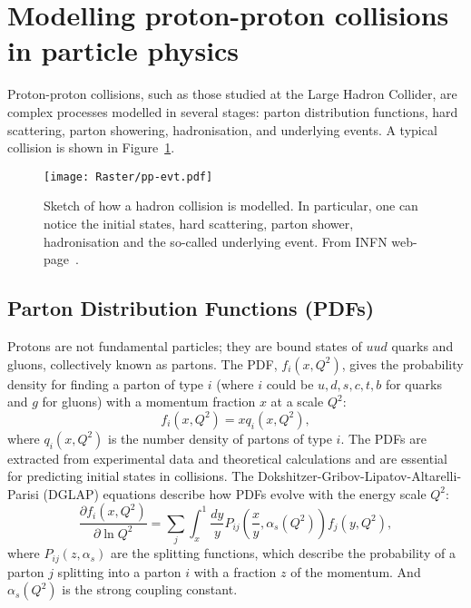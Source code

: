 \section{Modelling proton-proton collisions in particle physics}
    Proton-proton collisions, such as those studied at the Large Hadron Collider, 
    are complex processes modelled in several stages: parton distribution functions, hard scattering,
    parton showering, hadronisation, and underlying events. A typical collision
    is shown in Figure~\ref{fig:pp_collision}.

    \begin{figure}[htbp]
        \centering
        \texttt{[image: Raster/pp-evt.pdf]}
        \caption{
            Sketch of how a hadron collision is modelled. 
            In particular, one can notice the initial states, hard scattering, parton shower, hadronisation and the so-called underlying event. 
            From INFN web-page~\cite{pp_event_sketch}.
        }
        \label{fig:pp_collision}
    \end{figure}

    \subsection{Parton Distribution Functions (PDFs)}
        Protons are not fundamental particles; they are bound states of $uud$ quarks and gluons, collectively known as partons. 
        The PDF, \( f_i(x, Q^2) \), gives the probability density for finding a parton of type \( i \) (where \( i \) could 
        be \( u, d, s, c, t, b \) for quarks and \( g \) for gluons) with a momentum fraction \( x \) at a scale \( Q^2 \):
        \[
        f_i(x, Q^2) = x q_i(x, Q^2),
        \]
        where \( q_i(x, Q^2) \) is the number density of partons of type \( i \).
        The PDFs are extracted from experimental data and theoretical calculations 
        and are essential for predicting initial states in collisions.
        The Dokshitzer-Gribov-Lipatov-Altarelli-Parisi (DGLAP) equations describe how PDFs evolve with the energy scale \( Q^2 \):
        \[
        \frac{\partial f_i(x, Q^2)}{\partial \ln Q^2} = \sum_j \int_x^1 \frac{dy}{y} P_{ij}\left(\frac{x}{y}, \alpha_s(Q^2)\right) f_j(y, Q^2),
        \]
        where \( P_{ij}(z, \alpha_s) \) are the splitting functions, which describe the probability of a parton
        \( j \) splitting into a parton \( i \) with a fraction \( z \) of the momentum. And \( \alpha_s(Q^2) \) 
        is the strong coupling constant.

